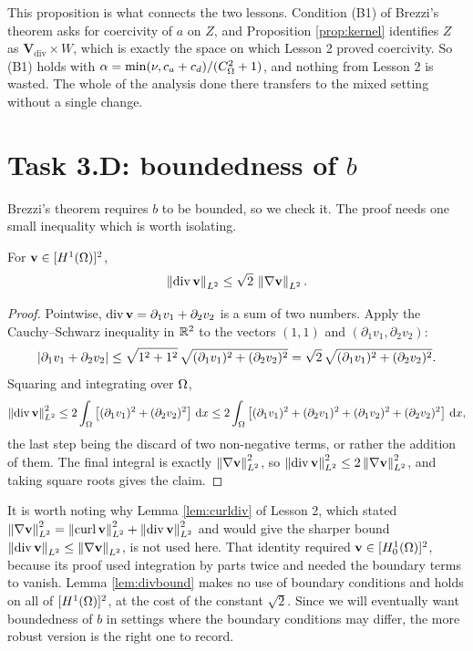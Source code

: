 \documentclass[11pt,a4paper]{article}
\newcommand{\Vdiv}{\mathbf{V}_{\mathrm{div}}}
\newcommand{\Wsp}{W}
\newcommand{\Zsp}{Z}
\begin{document}
\begin{remark}
This proposition is what connects the two lessons. Condition (B1) of Brezzi's
theorem asks for coercivity of $a$ on $\Zsp$, and Proposition \ref{prop:kernel}
identifies $\Zsp$ as $\Vdiv \times \Wsp$, which is exactly the space on which
Lesson 2 proved coercivity. So (B1) holds with
$\alpha = \min(\nu, c_{a}+c_{d})/(C_\Omega^{2}+1)$, and nothing from Lesson 2 is
wasted. The whole of the analysis done there transfers to the mixed setting
without a single change.
\end{remark}

\section{Task 3.D: boundedness of $b$}

Brezzi's theorem requires $b$ to be bounded, so we check it. The proof needs one
small inequality which is worth isolating.

\begin{lemma}\label{lem:divbound}
For $\mathbf{v} \in [H^{1}(\Omega)]^{2}$,
\[
  \left\lVert \operatorname{div} \mathbf{v} \right\rVert_{L^{2}} \le \sqrt{2}\, \left\lVert \nabla \mathbf{v} \right\rVert_{L^{2}} .
\]
\end{lemma}

\begin{proof}
Pointwise, $\operatorname{div} \mathbf{v} = \partial_{1}v_{1} + \partial_{2}v_{2}$ is a sum of two
numbers. Apply the Cauchy--Schwarz inequality in $\mathbb{R}^{2}$ to the vectors
$(1,1)$ and $(\partial_{1}v_{1}, \partial_{2}v_{2})$:
\[
  \left\lvert \partial_{1}v_{1} + \partial_{2}v_{2} \right\rvert
  \le \sqrt{1^{2}+1^{2}}\,
  \sqrt{(\partial_{1}v_{1})^{2} + (\partial_{2}v_{2})^{2}}
  = \sqrt{2}\,\sqrt{(\partial_{1}v_{1})^{2} + (\partial_{2}v_{2})^{2}} .
\]
Squaring and integrating over $\Omega$,
\[
  \left\lVert \operatorname{div} \mathbf{v} \right\rVert_{L^{2}}^{2}
  \le 2 \int_\Omega \left[ (\partial_{1}v_{1})^{2} + (\partial_{2}v_{2})^{2} \right] \,\mathrm{d}x
  \le 2 \int_\Omega \left[ (\partial_{1}v_{1})^{2} + (\partial_{2}v_{1})^{2}
  + (\partial_{1}v_{2})^{2} + (\partial_{2}v_{2})^{2} \right] \,\mathrm{d}x ,
\]
the last step being the discard of two non-negative terms, or rather the
addition of them. The final integral is exactly $\left\lVert \nabla \mathbf{v} \right\rVert_{L^{2}}^{2}$, so
$\left\lVert \operatorname{div} \mathbf{v} \right\rVert_{L^{2}}^{2} \le 2\left\lVert \nabla \mathbf{v} \right\rVert_{L^{2}}^{2}$, and taking square roots
gives the claim.
\end{proof}

\begin{remark}
It is worth noting why Lemma \ref{lem:curldiv} of Lesson 2, which stated
$\left\lVert \nabla \mathbf{v} \right\rVert_{L^{2}}^{2} = \left\lVert \operatorname{curl} \mathbf{v} \right\rVert_{L^{2}}^{2} + \left\lVert \operatorname{div} \mathbf{v} \right\rVert_{L^{2}}^{2}$ and
would give the sharper bound $\left\lVert \operatorname{div} \mathbf{v} \right\rVert_{L^{2}} \le \left\lVert \nabla \mathbf{v} \right\rVert_{L^{2}}$, is not
used here. That identity required $\mathbf{v} \in [H^{1}_{0}(\Omega)]^{2}$, because its proof
used integration by parts twice and needed the boundary terms to vanish. Lemma
\ref{lem:divbound} makes no use of boundary conditions and holds on all of
$[H^{1}(\Omega)]^{2}$, at the cost of the constant $\sqrt{2}$. Since we will eventually
want boundedness of $b$ in settings where the boundary conditions may differ,
the more robust version is the right one to record.
\end{remark}
\end{document}
